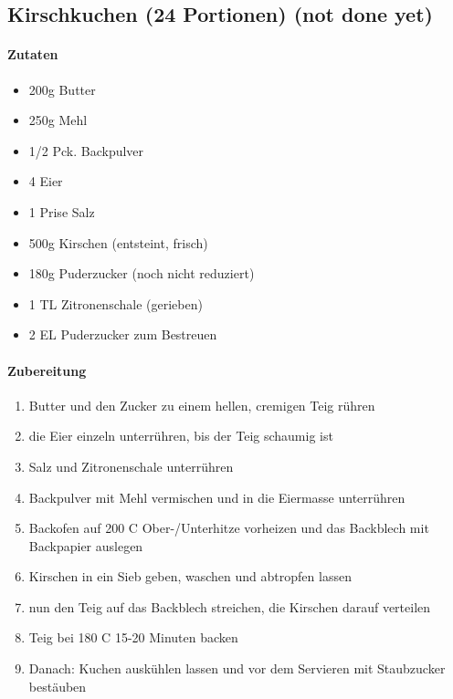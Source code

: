\newpage
\subsection{Kirschkuchen (24 Portionen) (not done yet)}
\paragraph{Zutaten}
\begin{itemize}[noitemsep]
	\item 200g Butter
	\item 250g Mehl
	\item 1/2 Pck. Backpulver
	\item 4 Eier
	\item 1 Prise Salz
	\item 500g Kirschen (entsteint, frisch)
	\item 180g Puderzucker (noch nicht reduziert)
	\item 1 TL Zitronenschale (gerieben)
	\item 2 EL Puderzucker zum Bestreuen
\end{itemize}
\paragraph{Zubereitung}
\begin{enumerate}[noitemsep]
	\item Butter und den Zucker zu einem hellen, cremigen Teig rühren
	\item die Eier einzeln unterrühren, bis der Teig schaumig ist
	\item Salz und Zitronenschale unterrühren
	\item Backpulver mit Mehl vermischen und in die Eiermasse unterrühren
	\item Backofen auf 200 \textdegree C Ober-/Unterhitze vorheizen und das Backblech mit Backpapier auslegen
	\item Kirschen in ein Sieb geben, waschen und abtropfen lassen
	\item nun den Teig auf das Backblech streichen, die Kirschen darauf verteilen
	\item Teig bei 180 \textdegree C 15-20 Minuten backen
	\item Danach: Kuchen auskühlen lassen und vor dem Servieren mit Staubzucker bestäuben
\end{enumerate}